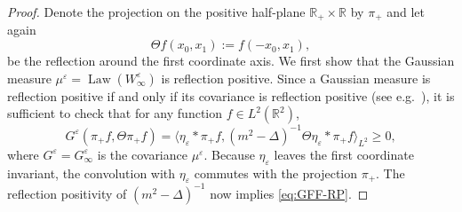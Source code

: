 \documentclass[11pt, a4paper]{scrartcl}
\numberwithin{equation}{section}
\theoremstyle{plain}
\theoremstyle{remark}
\newcommand{\assign}{:=}
\newcommand{\tmop}[1]{\ensuremath{\operatorname{#1}}}
\begin{document}
\begin{proof}
	Denote the projection on the positive half-plane $\mathbb{R}_+ \times
		\mathbb{R}$ by $\pi_+$ and let again
	\[ \Theta f (x_0, x_1) \assign f (- x_0, x_1), \]
	be the reflection around the first coordinate axis. We first show that the
	Gaussian measure $\mu^{\varepsilon} = \tmop{Law} (W_{\infty}^{\varepsilon})$
	is reflection positive. Since a Gaussian measure is reflection positive if
	and only if its covariance is reflection positive (see e.g.~{\cite[Theorem
		6.2.2.]{glimmQuantumPhysicsFunctional2012}}), it is sufficient to check that
	for any function $f \in L^2 (\mathbb{R}^2)$,
	\begin{equation}
		G^{\varepsilon} (\pi_+ f, \Theta \pi_+ f) = \langle \eta_{\varepsilon}
		\ast \pi_+ f, (m^2 - \Delta)^{- 1} \Theta \eta_{\varepsilon} \ast \pi_+ f
		\rangle_{L^2} \geqslant 0, \label{eq:GFF-RP}
	\end{equation}
	where $G^{\varepsilon} = G^{\varepsilon}_{\infty}$ is the covariance
	$\mu^{\varepsilon}$. Because $\eta_{\varepsilon}$ leaves the first
	coordinate invariant, the convolution with $\eta_{\varepsilon}$ commutes
	with the projection $\pi_+$. The reflection positivity of $(m^2 - \Delta)^{-
				1}$ now implies \eqref{eq:GFF-RP}.


\end{proof}
\end{document}
